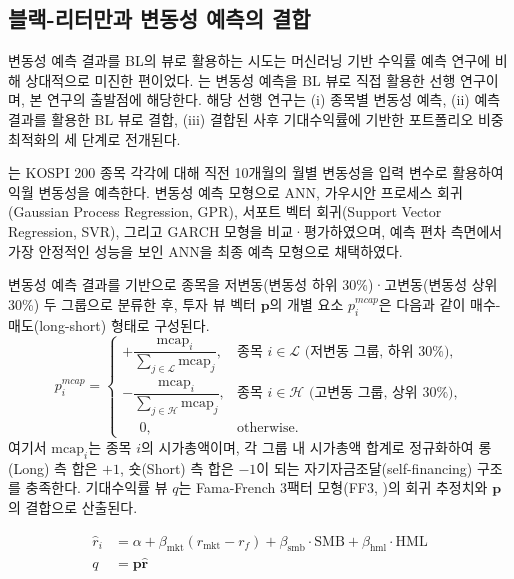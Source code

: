\documentclass[eng]{kjas3}
\begin{document}
\subsection{블랙-리터만과 변동성 예측의 결합}
\label{subsec:bl_vol_review}

변동성 예측 결과를 BL의 뷰로 활용하는 시도는 머신러닝 기반 수익률 예측 연구에 비해 상대적으로 미진한 편이었다. \citet{pyo2018}는 변동성 예측을 BL 뷰로 직접 활용한 선행 연구이며, 본 연구의 출발점에 해당한다. 해당 선행 연구는 (i) 종목별 변동성 예측, (ii) 예측 결과를 활용한 BL 뷰로 결합, (iii) 결합된 사후 기대수익률에 기반한 포트폴리오 비중 최적화의 세 단계로 전개된다.

\citet{pyo2018}는 KOSPI 200 종목 각각에 대해 직전 10개월의 월별 변동성을 입력 변수로 활용하여 익월 변동성을 예측한다. 변동성 예측 모형으로 ANN, 가우시안 프로세스 회귀(Gaussian Process Regression, GPR), 서포트 벡터 회귀(Support Vector Regression, SVR), 그리고 GARCH 모형을 비교·평가하였으며, 예측 편차 측면에서 가장 안정적인 성능을 보인 ANN을 최종 예측 모형으로 채택하였다.

변동성 예측 결과를 기반으로 종목을 저변동(변동성 하위 30\%)·고변동(변동성 상위 30\%) 두 그룹으로 분류한 후, 투자 뷰 벡터 $\mathbf{p}$의 개별 요소  $p_i^{mcap}$은 다음과 같이 매수-매도(long-short) 형태로 구성된다.
\begin{equation}
    p_i^{mcap} = \begin{cases}
    +\dfrac{\mathrm{mcap}_i}{\sum_{j \in \mathcal{L}} \mathrm{mcap}_j},  & \text{종목 } i \in \mathcal{L} \text{ (저변동 그룹, 하위 30\%)} ,\\[8pt]
    -\dfrac{\mathrm{mcap}_i}{\sum_{j \in \mathcal{H}} \mathrm{mcap}_j}, & \text{종목 } i \in \mathcal{H} \text{ (고변동 그룹, 상위 30\%)}, \\[6pt]
    \phantom{+}0,                & \text{otherwise}.
\end{cases}
    \label{eq:pyo_p}
\end{equation}
여기서 $\mathrm{mcap}_i$는 종목 $i$의 시가총액이며, 각 그룹 내 시가총액 합계로 정규화하여 롱(Long) 측 합은 $+1$, 숏(Short) 측 합은 $-1$이 되는 자기자금조달(self-financing) 구조를 충족한다. 기대수익률 뷰 $q$는 Fama-French 3팩터 모형(FF3, \citep{fama1993common})의 회귀 추정치와 $\mathbf{p}$의 결합으로 산출된다.

\begin{align}
\hat{r}_i &= \alpha + \beta_{\text{mkt}}(r_{\text{mkt}} - r_f)
           + \beta_{\text{smb}} \cdot \text{SMB}
           + \beta_{\text{hml}} \cdot \text{HML} \label{eq:pyo_ff3}\\
q &= \mathbf{p} \hat{\mathbf{r}} \label{eq:pyo_q}
\end{align}
\end{document}
